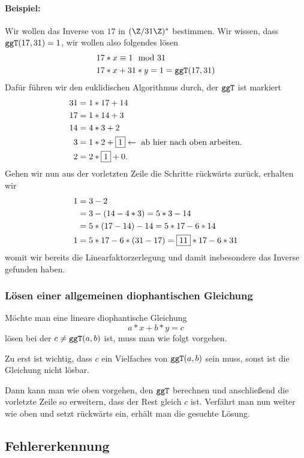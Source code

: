 \paragraph{Beispiel:}
Wir wollen das Inverse von $17$ in $(\Z/31\Z)^\ast$ bestimmen. Wir wissen, dass $\texttt{ggT}(17,31)=1$, wir wollen also folgendes lösen
\begin{align*}
	&17*x\equiv 1 \mod 31\\
	&17*x+31*y=1=\texttt{ggT}(17,31)
\end{align*}
Dafür führen wir den euklidischen Algorithmus durch, der $\texttt{ggT}$ ist markiert
\begin{align*}
	31&=1*17+14\\
	17&=1*14+3\\
	14&=4*3+2\\
	3&=1*2+\fbox{1} \leftarrow \text{ ab hier nach oben arbeiten.}\\
	2&=2*\fbox{1}+0.
\end{align*}
Gehen wir nun aus der vorletzten Zeile die Schritte rückwärts zurück, erhalten wir
\begin{align*}
	1&=3-2\\
	&=3-(14-4*3)=5*3-14\\
	&=5*(17-14)-14=5*17-6*14\\
	1&=5*17-6*(31-17)=\fbox{11}*17-6*31
\end{align*}
womit wir bereits die Linearfaktorzerlegung und damit insbesondere das Inverse gefunden haben.

\subsubsection{Lösen einer allgemeinen diophantischen Gleichung}
Möchte man eine lineare diophantische Gleichung 
\begin{equation*}
	a*x+b*y=c
\end{equation*}
lösen bei der $c\neq\texttt{ggT}(a,b)$ ist, muss man wie folgt vorgehen.

Zu erst ist wichtig, dass $c$ ein Vielfaches von $\texttt{ggT}(a,b)$ sein muss, sonst ist die Gleichung nicht lösbar.

Dann kann man wie oben vorgehen, den $\texttt{ggT}$ berechnen und anschließend die vorletzte Zeile so erweitern, dass der Rest gleich $c$ ist. Verfährt man nun weiter wie oben und setzt rückwärts ein, erhält man die gesuchte Lösung.

\subsection{Fehlererkennung}


